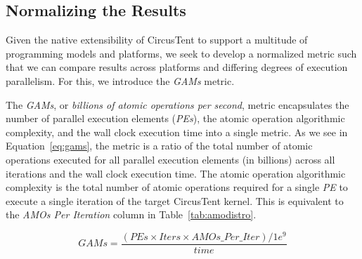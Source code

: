 \subsection{Normalizing the Results}
\label{subsec:normalizingtheresults}

Given the native extensibility of CircusTent to support a multitude of programming models and platforms, we seek to develop a normalized metric such that we can compare results across platforms and differing degrees of execution parallelism.
For this, we introduce the \textit{GAMs} metric.  

The \textit{GAMs}, or \textit{billions of atomic operations per second}, metric encapsulates the number of parallel execution elements (\textit{PEs}), the atomic operation algorithmic complexity, and the wall clock execution time into a single metric.
As we see in Equation~\ref{eq:gams}, the metric is a ratio of the total number of atomic operations executed for all parallel execution elements (in billions) across all iterations and the wall clock execution time.
The atomic operation algorithmic complexity is the total number of atomic operations required for a single \textit{PE} to execute a single iteration of the target CircusTent kernel.
This is equivalent to the \textit{AMOs Per Iteration} column in Table~\ref{tab:amodistro}.  

\begin{equation}
\label{eq:gams}
  GAMs = \frac{(PEs \times Iters \times AMOs\_Per\_Iter)/1e^{9}}{time}
\end{equation}

